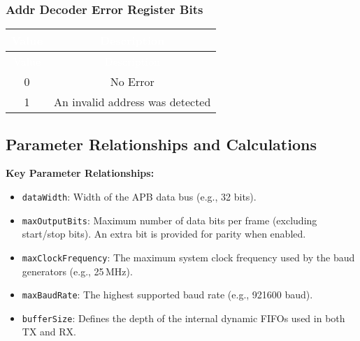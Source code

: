 \subsubsection{Addr Decoder Error Register Bits}
\renewcommand*{\arraystretch}{1.25}
\begingroup
\small
{}
\begin{longtable}{|c|c|}
    \hline
    \rowcolor{gray}
    \textcolor{white}{Value} & \textcolor{white}{Description}  \\ \hline
    \endfirsthead

    \hline
    \rowcolor{gray}
    \textcolor{white}{Value} & \textcolor{white}{Description}  \\ \hline
    \endhead

    \hline
    \endfoot

    0 & No Error \\ \hline
    1 & An invalid address was detected \\ \hline
\end{longtable}
\label{table:uart_addrdecode_error}
\endgroup

\subsection{Parameter Relationships and Calculations}

\textbf{Key Parameter Relationships:}
\begin{itemize}
    \item \texttt{dataWidth}: Width of the APB data bus (e.g., 32 bits).
    \item \texttt{maxOutputBits}: Maximum number of data bits per frame (excluding start/stop bits). An extra bit is provided for parity when enabled.
    \item \texttt{maxClockFrequency}: The maximum system clock frequency used by the baud generators (e.g., 25\,MHz).
    \item \texttt{maxBaudRate}: The highest supported baud rate (e.g., 921600 baud).
    \item \texttt{bufferSize}: Defines the depth of the internal dynamic FIFOs used in both TX and RX.
\end{itemize}

